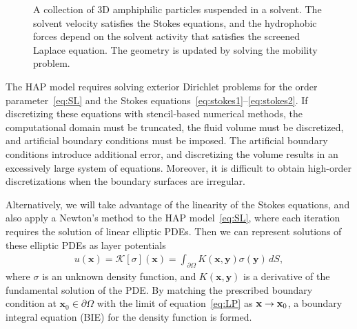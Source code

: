 \label{subsec:specific_aim_2}
\begin{figure}
    \vspace{-15pt}
    \caption{\label{fig:flow_map} \footnotesize A collection of 3D
    amphiphilic particles suspended in a solvent. The solvent velocity
    satisfies the Stokes equations, and the hydrophobic forces depend on
    the solvent activity that satisfies the screened Laplace equation.
    The geometry is updated by solving the mobility problem.} 
\end{figure}
The HAP model requires solving exterior Dirichlet problems for the order
parameter~\eqref{eq:SL} and the Stokes
equations~\eqref{eq:stokes1}--\eqref{eq:stokes2}. If discretizing these
equations with stencil-based numerical methods, the computational domain
must be truncated, the fluid volume must be discretized, and artificial
boundary conditions must be imposed. The artificial boundary conditions
introduce additional error, and discretizing the volume results in an
excessively large system of equations. Moreover, it is difficult to
obtain high-order discretizations when the boundary surfaces are
irregular. 

Alternatively, we will take advantage of the linearity of the Stokes
equations, and also apply a Newton's method to the HAP
model~\eqref{eq:SL}, where each iteration requires the solution of
linear elliptic PDEs. Then we can represent solutions of these elliptic
PDEs as layer potentials
\begin{align}
  \label{eq:LP}
  u(\mathbf{x}) = \mathcal{K}[\sigma](\mathbf{x}) = 
  \int_{\partial\Omega} K(\mathbf{x},\mathbf{y})
  \sigma(\mathbf{y})\,dS,
\end{align}
where $\sigma$ is an unknown density function, and
$K(\mathbf{x},\mathbf{y})$ is a derivative of the fundamental solution
of the PDE. By matching the prescribed boundary condition at
$\mathbf{x}_0 \in \partial\Omega$ with the limit of
equation~\eqref{eq:LP} as $\mathbf{x} \rightarrow \mathbf{x}_0$, a boundary integral
equation (BIE) for the density function is formed. 

